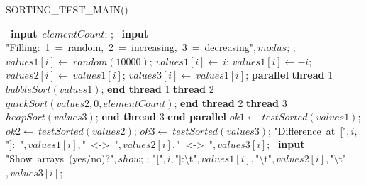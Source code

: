 \documentclass[a4paper,10pt]{article}
\begin{document}
\begin{algorithm}
\caption{SORTING\_TEST\_MAIN()}
\begin{algorithmic}[5]

\STATE {}
\STATE {}
\STATE {}
\STATE {}
  \REPEAT
    \STATE\ \textbf{input}\ \(elementCount\);
  ;
  \REPEAT
    \STATE\ \textbf{input}\ \(\)"{}Filling:\ 1\ =\ random,\ 2\ =\ increasing,\ 3\ =\ decreasing"{}\(,modus\);
  ;
      \STATE \(values1[i]\gets\ random(10000)\);
      \STATE \(values1[i]\gets\ i\);
      \STATE \(values1[i]\gets-i\);
    \ENDIF
  \ENDFOR
    \STATE \(values2[i]\gets\ values1[i]\);
    \STATE \(values3[i]\gets\ values1[i]\);
  \ENDFOR
  \STATE \textbf{parallel}  \BODY
    \STATE \textbf{thread} 1 \BODY
      \STATE \(bubbleSort(values1)\);
    \ENDBODY \STATE \textbf{end thread} 1
    \STATE \textbf{thread} 2 \BODY
      \STATE \(quickSort(values2,0,elementCount)\);
    \ENDBODY \STATE \textbf{end thread} 2
    \STATE \textbf{thread} 3 \BODY
      \STATE \(heapSort(values3)\);
    \ENDBODY \STATE \textbf{end thread} 3
  \ENDBODY \STATE \textbf{end parallel}
  \STATE \(ok1\gets\ testSorted(values1)\);
  \STATE \(ok2\gets\ testSorted(values2)\);
  \STATE \(ok3\gets\ testSorted(values3)\);
        \PRINT\(\)"{}Difference\ at\ ["{}\(,i,\)"{}]:\ "{}\(,values1[i],\)"{}\ \textless-\textgreater\ "{}\(,values2[i],\)"{}\ \textless-\textgreater\ "{}\(,values3[i]\);
      \ENDIF
    \ENDFOR
  \ENDIF
  \REPEAT
    \STATE\ \textbf{input}\ \(\)"{}Show\ arrays\ (yes/no)?"{}\(,show\);
  ;
      \PRINT\(\)"{}["{}\(,i,\)"{}]:\textbackslash{}t"{}\(,values1[i],\)"{}\textbackslash{}t"{}\(,values2[i],\)"{}\textbackslash{}t"{}\(,values3[i]\);
    \ENDFOR
  \ENDIF

\end{algorithmic}
\end{algorithm}
\end{document}
